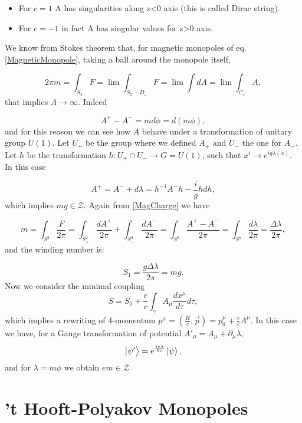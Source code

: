 \documentclass[main.tex]{subfiles}
\begin{document}
\begin{itemize}
\item For $c=1$ A has singularities along z<0 axis (this is called Dirac string).
\item For $c=-1$ in fact A has singular values for z>0 axis.
\end{itemize}
We know from Stokes theorem that, for magnetic monopoles of eq. \eqref{MagneticMonopole}, taking a ball around the monopole itself,

\begin{equation}\label{MagCharge}
2\pi m=\int_{S_2} F=\lim\int_{S_2-D_{\varepsilon}}F=\lim\int dA=\lim\int_{C_{\varepsilon}} A,
\end{equation}
that implies $A\to\infty$. Indeed

\begin{equation}
A^+-A^-=md\phi=d(m\phi),
\end{equation}
and for this reason we can see how $A$ behave under a transformation of unitary group $U(1)$. Let $U_+$ be the group where we defined $A_+$ and $U_-$ the one for $A_-$.
Let $h$ be the transformation $h:U_+\cap U_- \to G=U(1)$, such that $x^i\to e^{ig\lambda(x)}$. In this case

\begin{equation}
A^+=A^-+d\lambda=h^{-1}A^-h-\frac{i}{g}h dh,
\end{equation}
which implies $mg\in \mathcal{Z}$. Again from \eqref{MagCharge} we have

\begin{equation}
m=\int_{S^2}\frac{F}{2\pi}=\int_{S^2_+}\frac{dA^+}{2\pi}+\int_{S^2_-}\frac{dA^-}{2\pi}=\int_{S^1}\frac{A^+-A^-}{2\pi}=\int_{S^1}\frac{d\lambda}{2\pi}=\frac{\Delta\lambda}{2\pi},
\end{equation}
and the winding number is:

\begin{equation}
S_1=\frac{g\Delta\lambda}{2\pi}=mg.
\end{equation}
Now we consider the minimal coupling
\begin{equation}
S=S_0+\frac{e}{c}\int_{\gamma}A_{\mu}\frac{dx^{\mu}}{d\tau}d\tau,
\end{equation}
which implies a rewriting of 4-momentum $p^{\mu}=\left(\frac{H}{c},\vec p\right)=p_0^{\mu}+\frac{e}{c}A^{\mu}$.
In this case we have, for a Gauge transformation of potential $A'_{\mu}=A_{\mu}+\partial_{\mu}\lambda$,
\begin{equation}
\ket{\psi'}=e^{\frac{ie\lambda}{\hbar c}}\ket{\psi},
\end{equation}
and for $\lambda=m\phi$ we obtain $em\in \mathcal{Z}$
\section{’t Hooft-Polyakov Monopoles}
\end{document}
